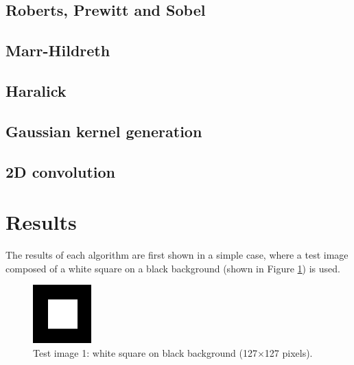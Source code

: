 \documentclass{ipol}
\numberwithin{equation}{section}
\numberwithin{table}{section}
\numberwithin{figure}{section}
\begin{document}
\subsection{Roberts, Prewitt and Sobel}


\subsection{Marr-Hildreth}
\label{app:marr-hildreth}


\subsection{Haralick}


\subsection{Gaussian kernel generation}


\subsection{2D convolution}


\clearpage


\section{Results}
\label{sec:results}

The results of each algorithm are first shown in a simple case, where a test image composed of a white square on a black background (shown in Figure \ref{fig:original1}) is used. \\

\begin{figure}[h!]
	\centering
	\includegraphics[width=0.2\textwidth]{results/square127.png}
	\caption{Test image 1: white square on black background (127$\times$127 pixels).}
	\label{fig:original1}
\end{figure}
\end{document}
